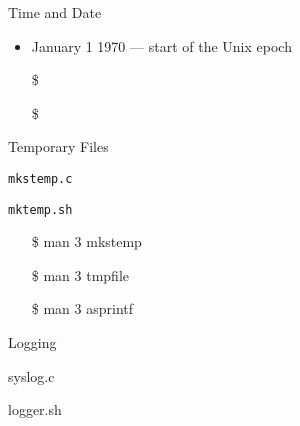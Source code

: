 
\begin{frame}{Time and Date}
  \centering
  \begin{itemize}
  \item January 1 1970 --- start of the Unix epoch
  \item[\$] 
  \item[\$] 
  \end{itemize}
\end{frame}

\begin{frame}{Temporary Files}
  \begin{minipage}[t]{.55\linewidth}
    \begin{iblock}{\texttt{mkstemp.c}}
    \end{iblock}
  \end{minipage}\qquad
  \begin{minipage}[t]{.35\linewidth}
    \begin{iblock}{\texttt{mktemp.sh}}
    \end{iblock}
    \ttfamily
    \begin{itemize}
    \item[\$] man 3 mkstemp
    \item[\$] man 3 tmpfile
    \item[\$] man 3 asprintf
    \end{itemize}
  \end{minipage}
\end{frame}

\begin{frame}{Logging}
  \begin{iblock}{\ttfamily syslog.c}
    \centering
  \end{iblock}
  \begin{iblock}{\ttfamily logger.sh}
    \centering
  \end{iblock}
\end{frame}

